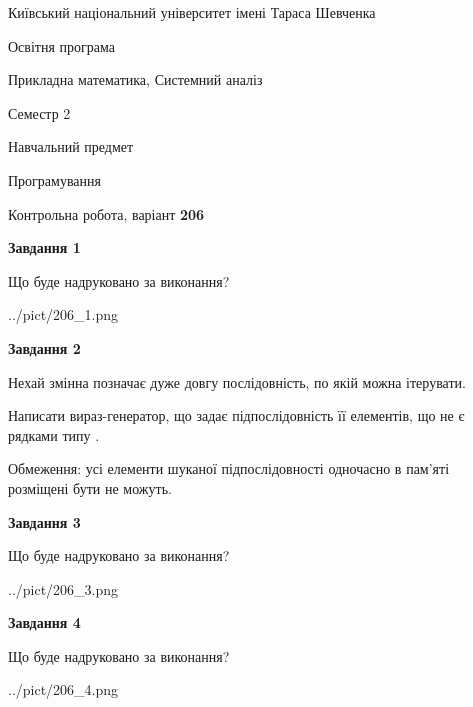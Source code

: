 \documentclass[12pt, ukrainian]{article}
\begin{document}
{{\begin {small}\par
{ \center  Київський національний університет імені Тараса Шевченка \par}
{\parbox {5 cm}{Освітня програма \hfill}{\parbox {8 cm}{Прикладна математика, Системний аналіз \hfill}}\parbox {5 cm}{\hfill Семестр 2}}\par
{\parbox {5 cm} {Навчальний предмет \hfill}\parbox {7 cm}{Програмування \hfill}\parbox {6cm}{\hfill}\par}\vspace{-7pt} \end{small}}{\center Контрольна робота, варіант  \No \textbf
{ 206 }\par}}
{
\begin {large}
{\begin {center}\textbf{Завдання 1}\end {center}}\par
Що буде надруковано за виконання?\par\par
\begin{center}
	{../pict/206_1.png}
\end{center}
\newpage

{\begin {center}\textbf{Завдання 2}\end {center}}\par
Нехай змінна  позначає дуже довгу послідовність, по якій можна ітерувати.

Написати вираз-генератор, що задає підпослідовність її елементів, що не є рядками типу .

Обмеження: усі елементи шуканої підпослідовності одночасно в пам'яті розміщені бути не можуть.\par
\newpage

{\begin {center}\textbf{Завдання 3}\end {center}}\par
Що буде надруковано за виконання?
\begin{center}
	{../pict/206_3.png}
\end{center}
\newpage

{\begin {center}\textbf{Завдання 4}\end {center}}\par
Що буде надруковано за виконання?\par
\begin{center}
	{../pict/206_4.png}
\end{center}
\newpage


\end{large}}
\end{document}

